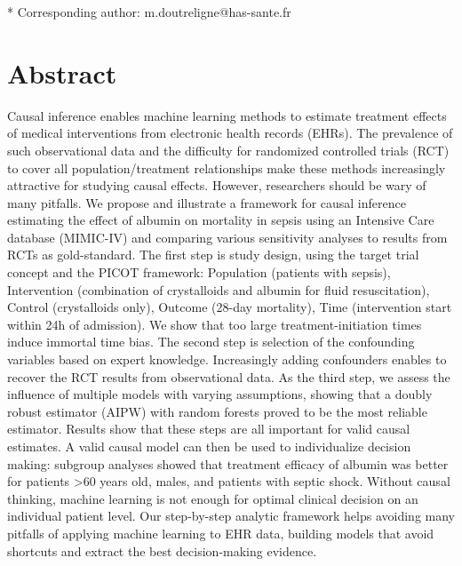 \documentclass[10pt,letterpaper]{article}
\begin{document}
\begin{flushleft}



  * Corresponding author: m.doutreligne@has-sante.fr


\end{flushleft}
\section*{Abstract}

Causal inference enables machine learning methods to estimate treatment effects of medical interventions from electronic health records (EHRs). The prevalence of such observational data and the difficulty for randomized controlled trials (RCT) to cover all population/treatment relationships make these methods increasingly attractive for studying causal effects. However, researchers should be wary of many pitfalls. We propose and illustrate a framework for causal inference estimating the effect of albumin on mortality in sepsis using an Intensive Care database (MIMIC-IV) and comparing various sensitivity analyses to results from RCTs as gold-standard. The first step is study design, using the target trial concept and the PICOT framework: Population (patients with sepsis), Intervention (combination of crystalloids and albumin for fluid resuscitation), Control (crystalloids only), Outcome (28-day mortality), Time (intervention start within 24h of admission). We show that too large treatment-initiation times induce immortal time bias. The second step is selection of the confounding variables based on expert knowledge. Increasingly adding confounders enables to recover the RCT results from observational data. As the third step, we assess the influence of multiple models with varying assumptions, showing that a doubly robust estimator (AIPW) with random forests proved to be the most reliable estimator. Results show that these steps are all important for valid causal estimates. A valid causal model can then be used to individualize decision making: subgroup analyses showed that treatment efficacy of albumin was better for patients >60 years old, males, and patients with septic shock. Without causal thinking, machine learning is not enough for  optimal clinical decision on an individual patient level. Our step-by-step analytic framework helps avoiding many pitfalls of applying machine learning to EHR data, building models that avoid shortcuts and extract the best decision-making evidence.
\end{document}
